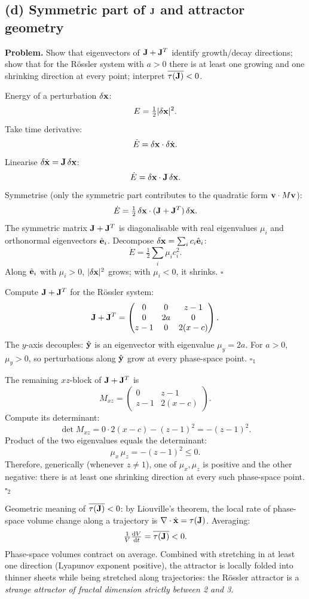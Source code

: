 \documentclass[11pt]{article}
\newcommand{\de}{\mathrm{d}}
\begin{document}
\subsection*{(d) Symmetric part of $\vb J$ and attractor geometry}

\textbf{Problem.} Show that eigenvectors of $\vb J + \vb J^T$ identify growth/decay directions; show that for the R\"ossler system with $a>0$ there is at least one growing and one shrinking direction at every point; interpret $\overline{\tau(\vb J)} < 0$.

Energy of a perturbation $\delta\vb x$:
\[
E = \tfrac{1}{2}|\delta\vb x|^2.
\]
Take time derivative:
\[
\dot E = \delta\vb x\cdot\delta\dot{\vb x}.
\]
Linearise $\delta\dot{\vb x} = \vb J\,\delta\vb x$:
\[
\dot E = \delta\vb x\cdot\vb J\,\delta\vb x.
\]
Symmetrise (only the symmetric part contributes to the quadratic form $\vb v\cdot M\vb v$):
\[
\dot E = \tfrac{1}{2}\,\delta\vb x\cdot(\vb J + \vb J^T)\,\delta\vb x.
\]
The symmetric matrix $\vb J + \vb J^T$ is diagonalisable with real eigenvalues $\mu_i$ and orthonormal eigenvectors $\hat{\vb e}_i$. Decompose $\delta\vb x = \sum_i c_i\hat{\vb e}_i$:
\[
\dot E = \tfrac{1}{2}\sum_i \mu_i c_i^2.
\]
Along $\hat{\vb e}_i$ with $\mu_i>0$, $|\delta\vb x|^2$ grows; with $\mu_i<0$, it shrinks. \hfill$\square$

Compute $\vb J + \vb J^T$ for the R\"ossler system:
\[
\vb J + \vb J^T = \begin{pmatrix} 0 & 0 & z-1 \\ 0 & 2a & 0 \\ z-1 & 0 & 2(x-c) \end{pmatrix}.
\]
The $y$-axis decouples: $\hat{\vb y}$ is an eigenvector with eigenvalue $\mu_y = 2a$. For $a > 0$, $\mu_y>0$, so perturbations along $\hat{\vb y}$ grow at every phase-space point. \hfill$\square_1$

The remaining $xz$-block of $\vb J+\vb J^T$ is
\[
M_{xz} = \begin{pmatrix} 0 & z-1 \\ z-1 & 2(x-c) \end{pmatrix}.
\]
Compute its determinant:
\[
\det M_{xz} = 0\cdot 2(x-c) - (z-1)^2 = -(z-1)^2.
\]
Product of the two eigenvalues equals the determinant:
\[
\mu_x\,\mu_z = -(z-1)^2 \le 0.
\]
Therefore, generically (whenever $z\ne 1$), one of $\mu_x,\mu_z$ is positive and the other negative: there is at least one shrinking direction at every such phase-space point. \hfill$\square_2$

Geometric meaning of $\overline{\tau(\vb J)}<0$: by Liouville's theorem, the local rate of phase-space volume change along a trajectory is $\nabla\cdot\dot{\vb x} = \tau(\vb J)$. Averaging:
\[
\tfrac{1}{V}\tfrac{\de V}{\de t} = \overline{\tau(\vb J)} < 0.
\]
Phase-space volumes contract on average. Combined with stretching in at least one direction (Lyapunov exponent positive), the attractor is locally folded into thinner sheets while being stretched along trajectories: the R\"ossler attractor is a \emph{strange attractor of fractal dimension strictly between 2 and 3}.
\end{document}
